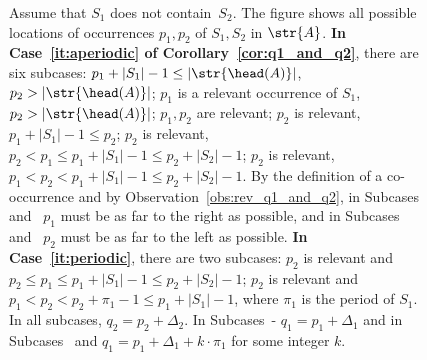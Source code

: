 \begin{figure}[h!]
\caption{Assume that $S_1$ does not contain~$S_2$. The figure shows all possible locations of occurrences $p_1, p_2$ of $S_1,S_2$ in $\str{A}$. \textbf{In Case~\ref{it:aperiodic} of Corollary~\ref{cor:q1_and_q2}}, there are six subcases:  $p_1+|S_1|-1 \le |\str{\head(A)}|$, $p_2 > |\str{\head(A)}|$;  $p_1$ is a relevant occurrence of $S_1$, $p_2 > |\str{\head(A)}|$;  $p_1,p_2$ are relevant;  $p_2$ is relevant, $p_1+|S_1|-1 \le p_2$;  $p_2$ is relevant, $p_2 < p_1 \le p_1+|S_1|-1 \le p_2 + |S_2|-1$;  $p_2$ is relevant, $p_1 < p_2 < p_1+|S_1|-1 \le p_2+|S_2|-1$. By the definition of a co-occurrence and by Observation~\ref{obs:rev_q1_and_q2}, in Subcases~ and~ $p_1$ must be as far to the right as possible, and in Subcases~ and~ $p_2$ must be as far to the left as possible. \textbf{In Case~\ref{it:periodic}}, there are two subcases:  $p_2$ is relevant and $p_2 \le p_1 \le p_1+|S_1|-1 \le p_2+|S_2|-1$;  $p_2$ is relevant and $p_1 < p_2 < p_2+\pi_1-1 \le p_1+|S_1|-1$, where $\pi_1$ is the period of $S_1$. In all subcases, $q_2=p_2+\Delta_2$. In Subcases~- $q_1=p_1+\Delta_1$ and in Subcases~ and  $q_1=p_1+\Delta_1+k\cdot \pi_1$ for some integer $k$.}
\label{fig:q1_and_q2}
\end{figure}